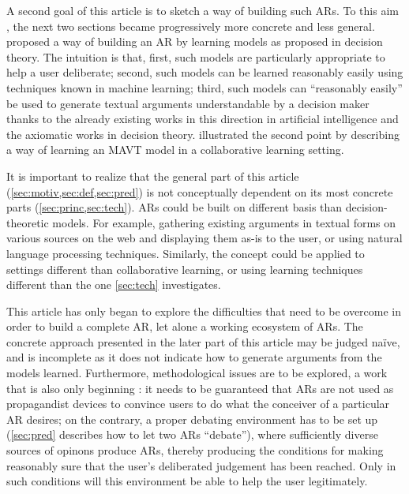 \documentclass[version=3.21, pagesize, twoside=off, bibliography=totoc, DIV=calc, fontsize=12pt, a4paper, french, english]{scrartcl}
\begin{document}
A second goal of this article is to sketch a way of building such \acp{AR}. To this aim , the next two sections became progressively more concrete and less general.  proposed a way of building an \ac{AR} by learning models as proposed in decision theory. The intuition is that, first, such models are particularly appropriate to help a user deliberate; second, such models can be learned reasonably easily using techniques known in machine learning; third, such models can “reasonably easily” be used to generate textual arguments understandable by a decision maker thanks to the already existing works in this direction in artificial intelligence and the axiomatic works in decision theory.  illustrated the second point by describing a way of learning an \ac{MAVT} model in a collaborative learning setting.

It is important to realize that the general part of this article (\cref{sec:motiv,sec:def,sec:pred}) is not conceptually dependent on its most concrete parts (\cref{sec:princ,sec:tech}). \Acp{AR} could be built on different basis  than decision-theoretic models. For example, gathering existing arguments in textual forms on various sources on the web and displaying them as-is to the user, or using natural language processing techniques. Similarly, the concept could be applied to settings different than collaborative learning, or using learning techniques different than the one \cref{sec:tech} investigates.

This article has only began  to explore the difficulties that need to be overcome in order to build a complete \ac{AR}, let alone a working ecosystem of \acp{AR}. The concrete approach presented in the later part of this article may be judged naïve, and is incomplete as it does not indicate how to generate arguments from the models learned. Furthermore, methodological issues are to be explored, a work that is also only beginning \citep{cailloux_formal_2018, meinard_justification_2018}: it needs to be guaranteed that \acp{AR} are not used as propagandist devices to convince users to do what the conceiver of a particular \ac{AR} desires; on the contrary, a proper debating environment has to be set up (\cref{sec:pred} describes how to let two \acp{AR} “debate”), where sufficiently diverse sources of opinons produce \acp{AR}, thereby producing the conditions for making reasonably sure that the user’s deliberated judgement has been reached. Only in such conditions will this environment be able to help the user legitimately.


\end{document}
